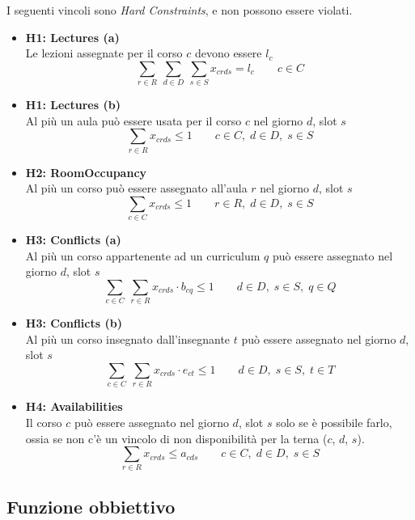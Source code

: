 \documentclass[]{article}
\begin{document}
I seguenti vincoli sono \textit{Hard Constraints}, e non possono essere violati.

\begin{itemize}
	\item \textbf{H1: Lectures (a)} \mbox{}\\
Le lezioni assegnate per il corso $c$ devono essere $l_c$
\[ \sum_{r \in R} \: \sum_{d \in D} \: \sum_{s \in S} x_{crds} = l_c  \qquad c \in C \]

	\item \textbf{H1: Lectures (b)}  \mbox{}\\
Al più un aula può essere usata per il corso $c$ nel giorno $d$, slot $s$
\[ \sum_{r \in R}  x_{crds} \le 1  \qquad c \in C, \; d \in D, \; s \in S \]

	\item \textbf{H2: RoomOccupancy}  \mbox{}\\
Al più un corso può essere assegnato all'aula $r$ nel giorno $d$, slot $s$
\[ \sum_{c \in C}  x_{crds} \le 1  \qquad r \in R, \; d \in D, \; s \in S \]

	\item \textbf{H3: Conflicts (a)}  \mbox{}\\
Al più un corso appartenente ad un curriculum $q$ può essere assegnato nel giorno $d$, slot $s$
\[ \sum_{c \in C} \: \sum_{r \in R}  x_{crds} \cdot b_{cq} \le 1  \qquad d \in D, \; s \in S, \; q \in Q \]

	\item \textbf{H3: Conflicts (b)}  \mbox{}\\
Al più un corso insegnato dall'insegnante $t$ può essere assegnato nel giorno $d$, slot $s$
\[ \sum_{c \in C} \: \sum_{r \in R}  x_{crds} \cdot e_{ct} \le 1  \qquad d \in D, \; s \in S, \; t \in T \]

	\item \textbf{H4: Availabilities}  \mbox{}\\
Il corso $c$ può essere assegnato nel giorno $d$, slot $s$ solo se è possibile farlo, ossia se non c'è un vincolo di non disponibilità per la terna ($c$, $d$, $s$).
\[ \sum_{r \in R}  x_{crds} \le a_{cds}  \qquad c \in C, \; d \in D, \; s \in S \]

\end{itemize}


\subsection{Funzione obbiettivo}
\end{document}
